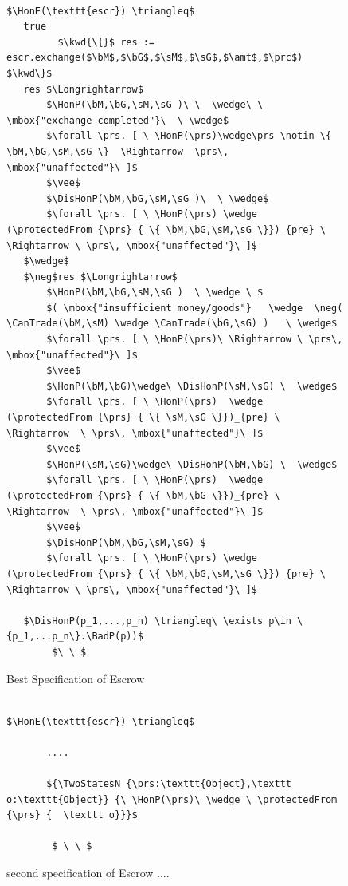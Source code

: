 \documentclass[acmsmall,review,anonymous,screen]{acmart}\settopmatter{printfolios=true,printacmref=false}
\begin{document}
 \begin{figure}[t]
\begin{lstlisting}[mathescape=true, language=Chainmail, frame=lines]

$\HonE(\texttt{escr}) \triangleq$     
   true
         $\kwd{\{}$ res := escr.exchange($\bM$,$\bG$,$\sM$,$\sG$,$\amt$,$\prc$) $\kwd\}$
   res $\Longrightarrow$
       $\HonP(\bM,\bG,\sM,\sG )\ \  \wedge\ \  \mbox{"exchange completed"}\  \ \wedge$
       $\forall \prs. [ \ \HonP(\prs)\wedge\prs \notin \{ \bM,\bG,\sM,\sG \}  \Rightarrow  \prs\, \mbox{"unaffected"}\ ]$           
       $\vee$
       $\DisHonP(\bM,\bG,\sM,\sG )\  \ \wedge$
       $\forall \prs. [ \ \HonP(\prs) \wedge  (\protectedFrom {\prs} { \{ \bM,\bG,\sM,\sG \}})_{pre} \ \Rightarrow \ \prs\, \mbox{"unaffected"}\ ]$
   $\wedge$
   $\neg$res $\Longrightarrow$
       $\HonP(\bM,\bG,\sM,\sG )  \ \wedge \ $
       $( \mbox{"insufficient money/goods"}   \wedge  \neg( \CanTrade(\bM,\sM) \wedge \CanTrade(\bG,\sG) )   \ \wedge$
       $\forall \prs. [ \ \HonP(\prs)\ \Rightarrow \ \prs\, \mbox{"unaffected"}\ ]$    
       $\vee$
       $\HonP(\bM,\bG)\wedge\ \DisHonP(\sM,\sG) \  \wedge$
       $\forall \prs. [ \ \HonP(\prs)  \wedge   (\protectedFrom {\prs} { \{ \sM,\sG \}})_{pre} \  \Rightarrow  \ \prs\, \mbox{"unaffected"}\ ]$
       $\vee$   
       $\HonP(\sM,\sG)\wedge\ \DisHonP(\bM,\bG) \  \wedge$
       $\forall \prs. [ \ \HonP(\prs)  \wedge   (\protectedFrom {\prs} { \{ \bM,\bG \}})_{pre} \  \Rightarrow  \ \prs\, \mbox{"unaffected"}\ ]$
       $\vee$  
       $\DisHonP(\bM,\bG,\sM,\sG) $
       $\forall \prs. [ \ \HonP(\prs) \wedge   (\protectedFrom {\prs} { \{ \bM,\bG,\sM,\sG \}})_{pre} \ \Rightarrow \ \prs\, \mbox{"unaffected"}\ ]$
  
   $\DisHonP(p_1,...,p_n) \triangleq\ \exists p\in \{p_1,...p_n\}.\BadP(p))$
        $\ \ $
\end{lstlisting}
\caption{Best Specification of Escrow  }
\label{fig:EscrowSpec}
 \end{figure}
 
  \begin{figure}[t]
\begin{lstlisting}[mathescape=true, language=Chainmail, frame=lines]

$\HonE(\texttt{escr}) \triangleq$     
  
       ....
       
       ${\TwoStatesN {\prs:\texttt{Object},\texttt o:\texttt{Object}} {\ \HonP(\prs)\ \wedge \ \protectedFrom {\prs} {  \texttt o}}}$
  
        $ \ \ $
\end{lstlisting}
\caption{second  specification of Escrow    ....}
\label{fig:EscrowSpecA}
 \end{figure}
 
\end{document}
